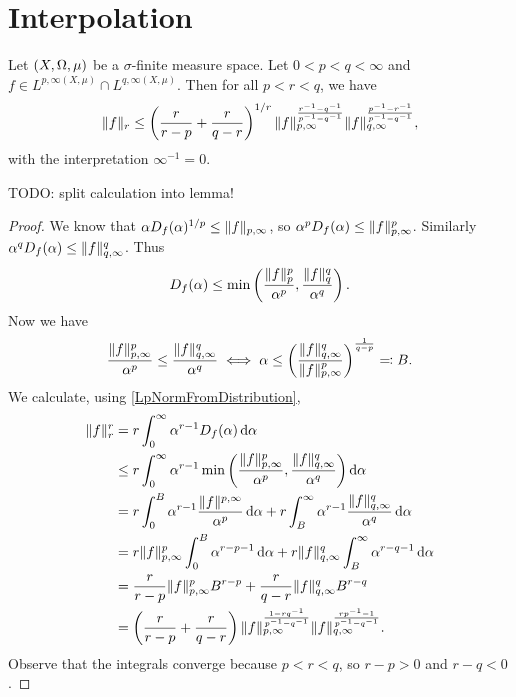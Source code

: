 \section{Interpolation}

\begin{proposition}
Let $\sSet{X,\Omega, \mu}$ be a $\sigma$-finite measure space.
Let $0<p<q<\infty$ and $f\in L^{p,\infty(X,\mu)} \cap L^{q,\infty(X,\mu)}$. Then for all $p<r<q$, we have
\[ \lVert f\rVert_r \leq \left(\frac{r}{r-p} + \frac{r}{q-r}\right)^{1/r}\lVert f\rVert_{p,\infty}^{\frac{r^{-1}- q^{-1}}{p^{-1} - q^{-1}}}\lVert f\rVert_{q,\infty}^{\frac{p^{-1}- r^{-1}}{p^{-1} - q^{-1}}}, \]
with the interpretation $\infty^{-1} = 0$.
\end{proposition}
TODO: split calculation into lemma!
\begin{proof}
We know that $\alpha D_f(\alpha)^{1/p} \leq \lVert f\rVert_{p,\infty}$, so $\alpha^p D_f(\alpha) \leq \lVert f\rVert_{p,\infty}^p$. Similarly $\alpha^q D_f(\alpha) \leq \lVert f\rVert_{q,\infty}^q$. Thus
\[ D_f(\alpha) \leq \min\left(\frac{\lVert f\rVert^p_p}{\alpha^p}, \frac{\lVert f\rVert^q_q}{\alpha^q}\right). \]
Now we have
\[ \frac{\lVert f\rVert^p_{p,\infty}}{\alpha^p} \leq \frac{\lVert f\rVert^q_{q,\infty}}{\alpha^q} \iff \alpha \leq \left(\frac{\lVert f\rVert_{q,\infty}^q}{\lVert f\rVert_{p,\infty}^p}\right)^{\frac{1}{q-p}} \eqqcolon B. \]
We calculate, using \ref{LpNormFromDistribution},
\begin{align*}
\lVert f\rVert_r^r &= r \int_0^\infty\alpha^{r-1}D_f(\alpha)\operatorname{d \!}{\alpha} \\
&\leq r \int_0^\infty\alpha^{r-1}\min\left(\frac{\lVert f\rVert^p_{p,\infty}}{\alpha^p}, \frac{\lVert f\rVert^q_{q,\infty}}{\alpha^q}\right)\operatorname{d \!}{\alpha} \\
&= r \int_0^B\alpha^{r-1}\frac{\lVert f\rVert^{p,\infty}}{\alpha^p}\operatorname{d \!}{\alpha} + r \int_B^\infty\alpha^{r-1}\frac{\lVert f\rVert^q_{q,\infty}}{\alpha^q}\operatorname{d \!}{\alpha} \\
&= r \lVert f\rVert^p_{p,\infty} \int_0^B\alpha^{r-p-1}\operatorname{d \!}{\alpha} + r \lVert f\rVert^q_{q,\infty} \int_B^\infty\alpha^{r-q-1}\operatorname{d \!}{\alpha} \\
&= \frac{r}{r-p} \lVert f\rVert^p_{p,\infty} B^{r-p} + \frac{r}{q-r} \lVert f\rVert^q_{q,\infty} B^{r-q} \\
&= \left(\frac{r}{r-p} + \frac{r}{q-r}\right)\lVert f\rVert_{p,\infty}^{\frac{1- rq^{-1}}{p^{-1} - q^{-1}}}\lVert f\rVert_{q,\infty}^{\frac{rp^{-1}- 1}{p^{-1} - q^{-1}}}.
\end{align*}
Observe that the integrals converge because $p<r<q$, so $r-p>0$ and $r-q<0$.
\end{proof}

